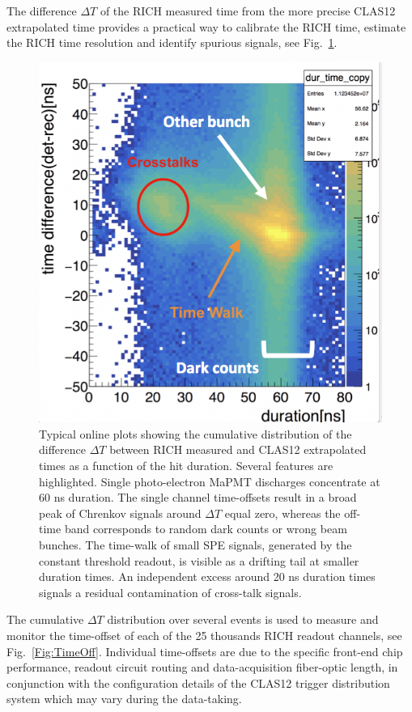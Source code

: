 \documentclass[final,5p,times,twocolumn]{elsarticle}
\def\MAPMT{MaPMT }
\def\dT{$\Delta T$ }
\begin{document}
The difference \dT of the RICH measured time from the more precise CLAS12 extrapolated time provides a practical way to 
calibrate the RICH time, estimate the RICH time resolution and identify spurious signals, see Fig.~\ref{Fig:Spurious}. 

\begin{figure}[t]
\begin{center}
\includegraphics[width=0.6\columnwidth]{EPS/Spurious_Components.png}
\end{center}
\caption{Typical online plots showing the cumulative distribution of the difference \dT between RICH measured 
and CLAS12 extrapolated times as a function of the hit duration. Several features are highlighted. 
Single photo-electron \MAPMT discharges concentrate at 60 ns duration. The single channel time-offsets result in 
a broad peak of Chrenkov signals around \dT equal zero, whereas the off-time band corresponds to random dark counts
or wrong beam bunches. The time-walk of small SPE signals, generated by the constant threshold readout, is visible 
as a drifting tail at smaller duration times. An independent excess around 20 ns duration times signals a residual 
contamination of cross-talk signals.}
\label{Fig:Spurious}
\end{figure}

The cumulative \dT distribution over several events is used to measure and monitor the time-offset of each of the 25 thousands
RICH readout channels, see Fig.~\ref{Fig:TimeOff}. Individual time-offsets are due to the specific front-end chip performance, readout 
circuit routing and data-acquisition fiber-optic length, in conjunction with the configuration details of the CLAS12 trigger 
distribution system which may vary during the data-taking.
\end{document}
